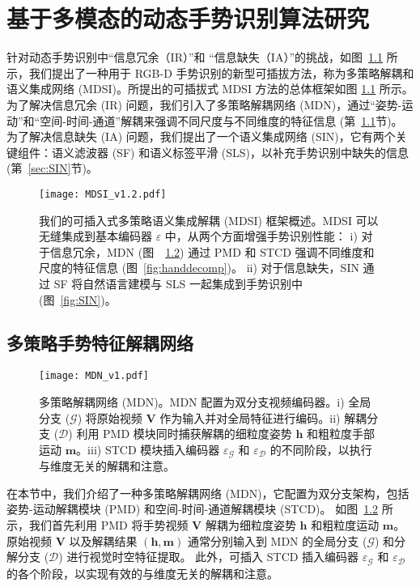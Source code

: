 
\chapter{基于多模态的动态手势识别算法研究}
\label{sec:GR}
针对动态手势识别中“信息冗余（IR）”和 “信息缺失（IA）”的挑战，如图~\ref{fig:MDSI} 所示，我们提出了一种用于 RGB-D 手势识别的新型可插拔方法，称为多策略解耦和语义集成网络 (MDSI)。所提出的可插拔式 MDSI 方法的总体框架如图 \ref{fig:MDSI} 所示。为了解决信息冗余 (IR) 问题，我们引入了多策略解耦网络 (MDN)，通过“姿势-运动”和“空间-时间-通道”解耦来强调不同尺度与不同维度的特征信息 (第~\ref{sec:MDN}节)。
为了解决信息缺失 (IA) 问题，我们提出了一个语义集成网络 (SIN)，它有两个关键组件：语义滤波器 (SF) 和语义标签平滑 (SLS)，以补充手势识别中缺失的信息 (第~\ref{sec:SIN}节)。
\begin{figure}[tb]
  \centering
  \texttt{[image: MDSI\_v1.2.pdf]}%
  \caption{我们的可插入式多策略语义集成解耦 (MDSI) 框架概述。MDSI 可以无缝集成到基本编码器 $\varepsilon$ 中，从两个方面增强手势识别性能：
  i) 对于信息冗余，MDN (图~~\ref{fig:MDN}) 通过 PMD 和 STCD 强调不同维度和尺度的特征信息 (图~\ref{fig:handdecomp})。
  ii) 对于信息缺失，SIN 通过 SF 将自然语言建模与 SLS 一起集成到手势识别中 (图~\ref{fig:SIN})。}
  \label{fig:MDSI}
\end{figure}

\section{多策略手势特征解耦网络}
\label{sec:MDN}
\begin{figure}[tb]
  \centering
  \texttt{[image: MDN\_v1.pdf]}
    \caption{多策略解耦网络 (MDN)。MDN 配置为双分支视频编码器。i) 全局分支 ($\mathcal{G}$) 将原始视频 $\mathbf{V}$ 作为输入并对全局特征进行编码。ii) 解耦分支 ($\mathcal{D}$) 利用 PMD 模块同时捕获解耦的细粒度姿势 $\mathbf{h}$ 和粗粒度手部运动 $\mathbf{m}$。iii) STCD 模块插入编码器 $\varepsilon_{\mathcal{G}}$ 和 $\varepsilon_{\mathcal{D}}$ 的不同阶段，以执行与维度无关的解耦和注意。}
  \label{fig:MDN}
\end{figure}

在本节中，我们介绍了一种多策略解耦网络 (MDN)，它配置为双分支架构，包括姿势-运动解耦模块 (PMD) 和空间-时间-通道解耦模块 (STCD)。
如图~\ref{fig:MDN} 所示，我们首先利用 PMD 将手势视频 $\mathbf{V}$ 解耦为细粒度姿势 $\mathbf{h}$ 和粗粒度运动 $\mathbf{m}$。原始视频 $\mathbf{V}$ 以及解耦结果 $\mathbf{(h, m)}$ 通常分别输入到 MDN 的全局分支 ($\mathcal{G}$) 和分解分支 ($\mathcal{D}$) 进行视觉时空特征提取。
此外，可插入 STCD 插入编码器 $\varepsilon_{\mathcal{G}}$ 和 $\varepsilon_{\mathcal{D}}$ 的各个阶段，以实现有效的与维度无关的解耦和注意。

